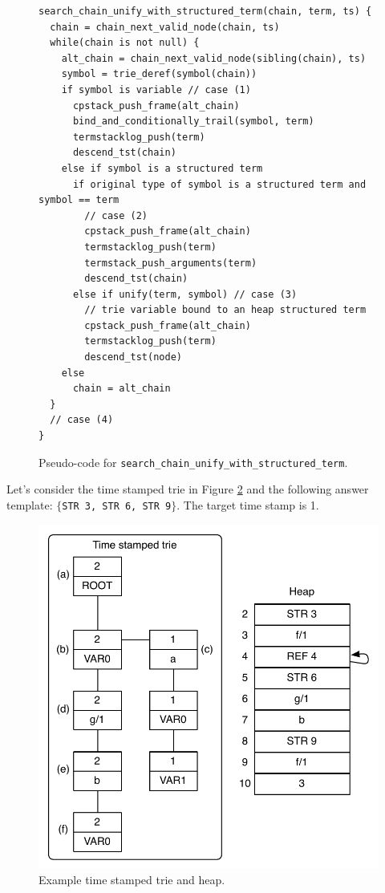 \begin{figure}[ht]
\begin{Verbatim}
search_chain_unify_with_structured_term(chain, term, ts) {
  chain = chain_next_valid_node(chain, ts)
  while(chain is not null) {
    alt_chain = chain_next_valid_node(sibling(chain), ts)
    symbol = trie_deref(symbol(chain))
    if symbol is variable // case (1)
      cpstack_push_frame(alt_chain)
      bind_and_conditionally_trail(symbol, term)
      termstacklog_push(term)
      descend_tst(chain)
    else if symbol is a structured term
      if original type of symbol is a structured term and symbol == term
        // case (2)
        cpstack_push_frame(alt_chain)
        termstacklog_push(term)
        termstack_push_arguments(term)
        descend_tst(chain)
      else if unify(term, symbol) // case (3)
        // trie variable bound to an heap structured term
        cpstack_push_frame(alt_chain)
        termstacklog_push(term)
        descend_tst(node)
    else
      chain = alt_chain
  }
  // case (4)
}
\end{Verbatim}
\caption{Pseudo-code for \texttt{search\_chain\_unify\_with\_structured\_term}.}
\label{fig:search_chain_unify_with_structured_term}
\end{figure}

Let's consider the time stamped trie in Figure \ref{fig:collect_functor}
and the following answer template: $\{$\texttt{STR 3, STR 6, STR 9}$\}$.
The target time stamp is 1.

\begin{figure}[ht]
  \centering
    \includegraphics[scale=0.6]{collect_functor.pdf}
  \caption{Example time stamped trie and heap.}
  \label{fig:collect_functor}
\end{figure}

